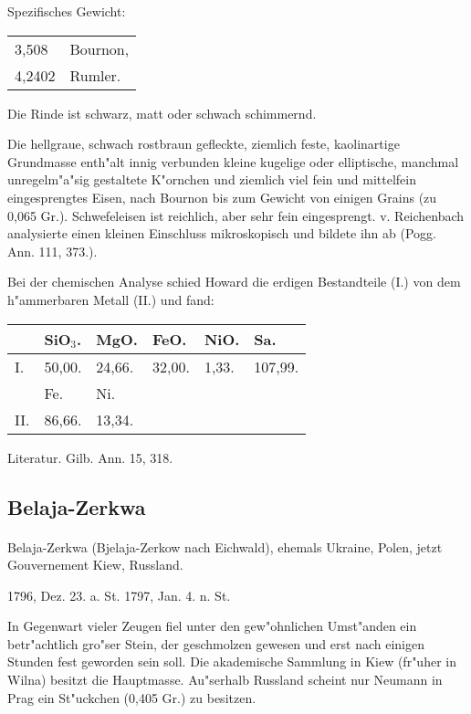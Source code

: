 \documentclass[a4paper, 11pt, oneside]{article}
\begin{document}
Spezifisches Gewicht:
\begin{table}[!ht]
    \centering
    \begin{tabular}{l l}
        3,508 & Bournon,\\
        4,2402 & Rumler.
    \end{tabular}
\end{table}

Die Rinde ist schwarz, matt oder schwach schimmernd.

Die hellgraue, schwach rostbraun gefleckte, ziemlich feste, kaolinartige Grundmasse enth"alt innig verbunden kleine kugelige oder elliptische, manchmal unregelm"a"sig gestaltete K"ornchen und ziemlich viel fein und mittelfein eingesprengtes Eisen, nach Bournon bis zum Gewicht von einigen Grains (zu 0,065 Gr.). Schwefeleisen ist reichlich, aber sehr fein eingesprengt. v. Reichenbach analysierte einen kleinen Einschluss mikroskopisch und bildete ihn ab (Pogg. Ann. 111, 373.).

Bei der chemischen Analyse schied Howard die erdigen Bestandteile (I.) von dem h"ammerbaren Metall (II.) und fand:
\begin{table}[H]
    \centering
    \begin{tabular}{l l l l l l}
         & SiO$_{3}$. & MgO. & FeO. & NiO. & Sa. \\ \hline
        I. & 50,00. & 24,66. & 32,00. & 1,33. & 107,99. \\
         & Fe. & Ni. &  &  &  \\
        II. & 86,66. & 13,34. &  &  &  \\
    \end{tabular}
\end{table}

\footnotesize
Literatur. Gilb. Ann. 15, 318.
\subsection{Belaja-Zerkwa}
\normalsize
\paragraph{}
Belaja-Zerkwa (Bjelaja-Zerkow nach Eichwald), ehemals Ukraine, Polen, jetzt Gouvernement Kiew, Russland.

1796, Dez. 23. a. St. 1797, Jan. 4. n. St.

In Gegenwart vieler Zeugen fiel unter den gew"ohnlichen Umst"anden ein betr"achtlich gro"ser Stein, der geschmolzen gewesen und erst nach einigen Stunden fest geworden sein soll. Die akademische Sammlung in Kiew (fr"uher in Wilna) besitzt die Hauptmasse. Au"serhalb Russland scheint nur Neumann in Prag ein St"uckchen (0,405 Gr.) zu besitzen.
\end{document}
